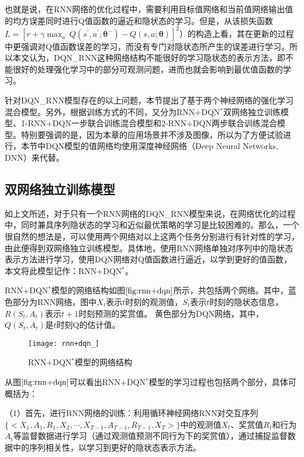 



也就是说，在RNN网络的优化过程中，需要利用目标值网络和当前值网络输出值的均方误差同时进行Q值函数的逼近和隐状态的学习。但是，从该损失函数$L=[r+\gamma \max_{a^{'}}Q(s^{'},a^{'};\bm{\theta}^{-})-Q(s,a;\bm{\theta})]^{2}$）的构造上看，其在更新的过程中更强调对Q值函数误差的学习，而没有专门对隐状态所产生的误差进行学习。所以本文认为，DQN\_RNN这种网络结构不能很好的学习隐状态的表示方法，即不能很好的处理强化学习中的部分可观测问题，进而也就会影响到最优值函数的学习。

针对DQN\_RNN模型存在的以上问题，本节提出了基于两个神经网络的强化学习混合模型。另外，根据训练方式的不同，又分为RNN+DQN$^{*}$双网络独立训练模型、1-RNN+DQN一步联合训练混合模型和2-RNN+DQN两步联合训练混合模型。特别要强调的是，因为本章的应用场景并不涉及图像，所以为了方便试验进行，本节中DQN模型的值网络均使用深度神经网络（Deep Neural Networks, DNN）来代替。

\subsection{双网络独立训练模型}
如上文所述，对于只有一个RNN网络的DQN\_RNN模型来说，在网络优化的过程中，同时兼具序列隐状态的学习和近似最优策略的学习是比较困难的。那么，一个很自然的想法是，可以使用两个网络对以上这两个任务分别进行有针对性的学习，由此便得到双网络独立训练模型。具体地，使用RNN网络单独对序列中的隐状态表示方法进行学习，使用DQN网络对Q值函数进行逼近，以学到更好的值函数，本文将此模型记作：RNN+DQN$^{*}$。

RNN+DQN$^{*}$模型的网络结构如图$\ref{fig:rnn+dqn}$所示，共包括两个网络。其中，蓝色部分为RNN网络，图中$X_{t}$表示$t$时刻的观测值，$S_{t}$表示$t$时刻的隐状态信息，$R(S_{t}, A_{t})$表示$t+1$时刻预测的奖赏值。
黄色部分为DQN网络，其中，$Q(S_{t},A_{t})$是$t$时刻Q的估计值。
\begin{figure}[htbp]
\centering
\texttt{[image: rnn+dqn\_]}
\caption{RNN+DQN$^{*}$模型的网络结构}
\label{fig:rnn+dqn}
\end{figure}

从图$\ref{fig:rnn+dqn}$可以看出RNN+DQN$^{*}$模型的学习过程也包括两个部分，具体可概括为：

（1）首先，进行RNN网络的训练：利用循环神经网络RNN对交互序列$\{<X_{1}, A_{1}, R_{1}, X_{2}, \cdots, X_{T-1}, A_{T-1}, R_{T-1},X_{T}>\}$中的观测值$X_{t}$、奖赏值$R_{t}$和行为$A_{t}$等监督数据进行学习（通过观测值预测不同行为下的奖赏值），通过捕捉监督数据中的序列相关性，以学习到更好的隐状态表示方法。

